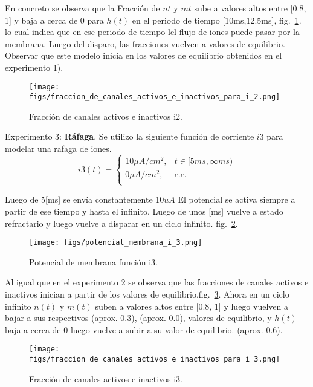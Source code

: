 \documentclass[aps,prl,twocolumn,groupedaddress]{revtex4-2}
\begin{document}
En concreto se observa que la Fracción de $nt$ y $mt$ sube a valores altos entre [0.8, 1] y baja a cerca de  0 para $h(t)$ en el periodo de tiempo [10ms,12.5ms], 
fig.~\ref{fig4}. lo cual indica que en ese periodo de tiempo lel flujo de iones puede pasar por la membrana.
Luego del disparo, las fracciones vuelven a valores de equilibrio.
Observar que este modelo inicia en los valores de equilibrio obtenidos en el experimento 1).\\



\begin{figure}[h!]
\centering
\texttt{[image: figs/fraccion\_de\_canales\_activos\_e\_inactivos\_para\_i\_2.png]}
\caption{Fracción de canales activos e inactivos i2. \label{fig4}}
\end{figure}

Experimento 3: \textbf{Ráfaga}. Se utilizo la siguiente función de corriente $i3$ para modelar una rafaga de iones.
$$
i3(t) = \left\{
\begin{array}{ll}
10 \mu A/cm^2, & t\in [5ms,\infty ms) \\
0 \mu A/cm^2, & c.c. \\
\end{array}
\right.
$$

Luego de 5[ms] se envía constantemente 10$uA$
El potencial se activa siempre a partir de ese tiempo y hasta el infinito.
Luego de unos [ms] vuelve a estado refractario y luego vuelve a disparar en un ciclo infinito. fig.~\ref{fig5}.



\begin{figure}[h!]
\centering
\texttt{[image: figs/potencial\_membrana\_i\_3.png]}
\caption{Potencial de membrana función i3. \label{fig5}}
\end{figure}

Al igual que en el experimento 2 se observa que las fracciones de canales activos e inactivos inician a partir de los valores de equilibrio.fig.~\ref{fig6}.
Ahora en un ciclo infinito $n(t)$ y $m(t)$ suben a valores altos entre
[0.8, 1] y luego vuelven a bajar a sus respectivos (aprox. 0.3), (aprox. 0.0), valores de equilibrio, 
y $h(t)$ baja a cerca de 0   luego vuelve a subir a su valor de equilibrio. (aprox. 0.6).



\begin{figure}[h!]
\centering
\texttt{[image: figs/fraccion\_de\_canales\_activos\_e\_inactivos\_para\_i\_3.png]}
\caption{Fracción de canales activos e inactivos i3. \label{fig6}}
\end{figure}
\end{document}
